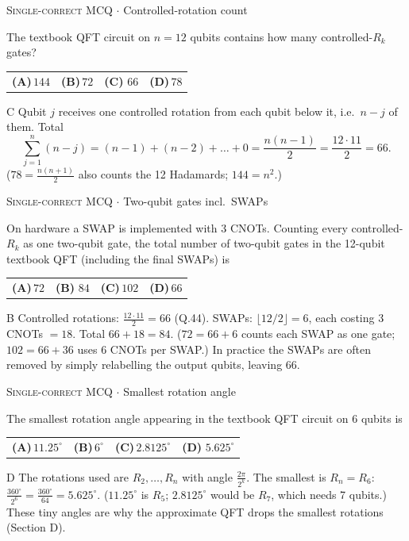 \documentclass[11pt,a4paper]{article}
\newcommand{\optlabel}[1]{\textbf{(#1)}}
\newcommand{\correctlabel}[1]{\textcolor{okgreen}{\textbf{(#1)}\,\ding{51}}}
\newenvironment{qitem}[1]{\begin{list}{}{\setlength{\leftmargin}{3.3em}\setlength{\labelwidth}{3.1em}%
  \setlength{\labelsep}{0.2em}\setlength{\topsep}{3pt}\setlength{\parsep}{3pt}}\item[\textbf{Q.#1}\hfill]}{\end{list}}
\newcommand{\qsep}{\par\vspace{2pt}{\color{black!15}\hrule}\vspace{4pt}}
\newcommand{\qmeta}[2]{{\footnotesize\color{black!60}\textsc{#1} \;$\cdot$\; #2}\par}
\begin{document}
\begin{qitem}{44}
\qmeta{Single-correct MCQ}{Controlled-rotation count}
The textbook QFT circuit on $n = 12$ qubits contains how many controlled-$R_k$ gates?
\par\smallskip\noindent\begin{tabularx}{\linewidth}{@{}*{4}{L}@{}}
\optlabel{A}\,$144$ & \optlabel{B}\,$72$ & \correctlabel{C}\,$66$ & \optlabel{D}\,$78$
\end{tabularx}
\end{qitem}
\begin{solbox}{C}
Qubit $j$ receives one controlled rotation from each qubit below it, i.e.\ $n - j$ of them. Total
\[ \sum_{j=1}^{n}(n - j) = (n-1) + (n-2) + \dots + 0 = \frac{n(n-1)}{2} = \frac{12\cdot11}{2} = 66 . \]
($78 = \frac{n(n+1)}{2}$ also counts the 12 Hadamards; $144 = n^2$.)
\end{solbox}
\qsep

\begin{qitem}{45}
\qmeta{Single-correct MCQ}{Two-qubit gates incl.\ SWAPs}
On hardware a SWAP is implemented with 3 CNOTs. Counting every controlled-$R_k$ as one two-qubit gate, the total number
of two-qubit gates in the 12-qubit textbook QFT (including the final SWAPs) is
\par\smallskip\noindent\begin{tabularx}{\linewidth}{@{}*{4}{L}@{}}
\optlabel{A}\,$72$ & \correctlabel{B}\,$84$ & \optlabel{C}\,$102$ & \optlabel{D}\,$66$
\end{tabularx}
\end{qitem}
\begin{solbox}{B}
Controlled rotations: $\frac{12\cdot11}{2} = 66$ (Q.44). SWAPs: $\lfloor 12/2\rfloor = 6$, each costing 3 CNOTs $= 18$.
Total $66 + 18 = 84$. ($72 = 66 + 6$ counts each SWAP as one gate; $102 = 66 + 36$ uses 6 CNOTs per SWAP.)
In practice the SWAPs are often removed by simply relabelling the output qubits, leaving 66.
\end{solbox}
\qsep

\begin{qitem}{46}
\qmeta{Single-correct MCQ}{Smallest rotation angle}
The smallest rotation angle appearing in the textbook QFT circuit on $6$ qubits is
\par\smallskip\noindent\begin{tabularx}{\linewidth}{@{}*{4}{L}@{}}
\optlabel{A}\,$11.25^\circ$ & \optlabel{B}\,$6^\circ$ & \optlabel{C}\,$2.8125^\circ$ & \correctlabel{D}\,$5.625^\circ$
\end{tabularx}
\end{qitem}
\begin{solbox}{D}
The rotations used are $R_2, \dots, R_n$ with angle $\frac{2\pi}{2^k}$. The smallest is $R_n = R_6$:
$\frac{360^\circ}{2^6} = \frac{360^\circ}{64} = 5.625^\circ$. ($11.25^\circ$ is $R_5$; $2.8125^\circ$ would be $R_7$, which needs 7 qubits.)
These tiny angles are why the approximate QFT drops the smallest rotations (Section D).
\end{solbox}
\qsep
\end{document}
